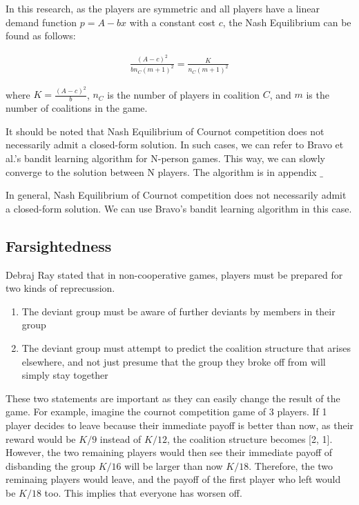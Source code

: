 \documentclass[sigconf,anonymous]{aamas}
\newcommand{\ykc}[1]{{\color{blue} #1}}
\begin{document}
In this research, as the players are symmetric and all players have a linear demand function $p = A - bx$ with a constant cost $c$, the Nash Equilibrium can be found as follows: 

\begin{eqnarray}
	\frac{(A-c)^2}{bn_C(m+1)^2} = \frac{K}{n_C(m+1)^2}
\end{eqnarray}

where $K = \frac{(A-c)^2}{b}$, $n_C$ is the number of players in coalition $C$, and $m$ is the number of coalitions in the game. 

It should be noted that Nash Equilibrium of Cournot competition does not necessarily admit a closed-form solution. In such cases, we can refer to Bravo et al.'s bandit learning algorithm for N-person games. This way, we can slowly converge to the solution between N players. The algorithm is in appendix $\_$%

\ykc{In general, Nash Equilibrium of Cournot competition does not necessarily admit a closed-form solution. We can use Bravo's bandit learning algorithm in this case.}

\subsection{Farsightedness} 
Debraj Ray stated that in non-cooperative games, players must be prepared for two kinds of reprecussion. 
\begin{enumerate}
	\item The deviant group must be aware of further deviants by members in their group 
	\item The deviant group must attempt to predict the coalition structure that arises elsewhere, and not just presume that the group they broke off from will simply stay together
\end{enumerate}
These two statements are important as they can easily change the result of the game. For example, imagine the cournot competition game of 3 players. If 1 player decides to leave because their immediate payoff is better than now, as their reward would be $K/9$ instead of $K/12$, the coalition structure becomes [2, 1]. However, the two remaining players would then see their immediate payoff of disbanding the group $K/16$ will be larger than now $K/18$. Therefore, the two reminaing players would leave, and the payoff of the first player who left would be $K/18$ too. This implies that everyone has worsen off. 
\end{document}
